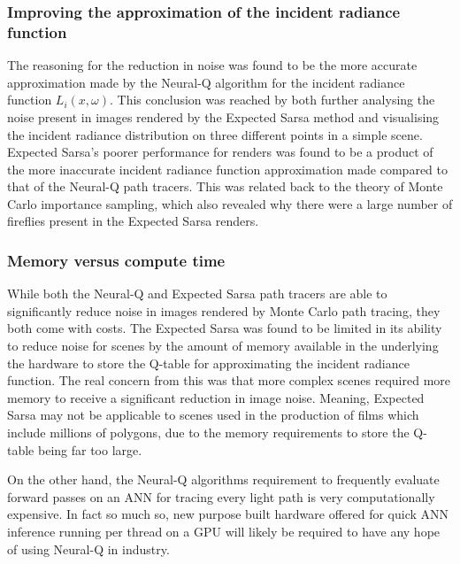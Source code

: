 \documentclass[../dissertation.tex]{subfiles}
\begin{document}
\subsubsection*{Improving the approximation of the incident radiance function}
The reasoning for the reduction in noise was found to be the more accurate approximation made by the Neural-Q algorithm for the incident radiance function $L_i(x, \omega)$. This conclusion was reached by both further analysing the noise present in images rendered by the Expected Sarsa method and visualising the incident radiance distribution on three different points in a simple scene. Expected Sarsa's poorer performance for renders was found to be a product of the more inaccurate incident radiance function approximation made compared to that of the Neural-Q path tracers. This was related back to the theory of Monte Carlo importance sampling, which also revealed why there were a large number of fireflies present in the Expected Sarsa renders. 

\subsubsection*{Memory versus compute time}
While both the Neural-Q and Expected Sarsa path tracers are able to significantly reduce noise in images rendered by Monte Carlo path tracing, they both come with costs. The Expected Sarsa was found to be limited in its ability to reduce noise for scenes by the amount of memory available in the underlying the hardware to store the Q-table for approximating the incident radiance function. The real concern from this was that more complex scenes required more memory to receive a significant reduction in image noise. Meaning, Expected Sarsa may not be applicable to scenes used in the production of films which include millions of polygons, due to the memory requirements to store the Q-table being far too large.

On the other hand, the Neural-Q algorithms requirement to frequently evaluate forward passes on an ANN for tracing every light path is very computationally expensive. In fact so much so, new purpose built hardware offered for quick ANN inference running per thread on a GPU will likely be required to have any hope of using Neural-Q in industry.
\end{document}
